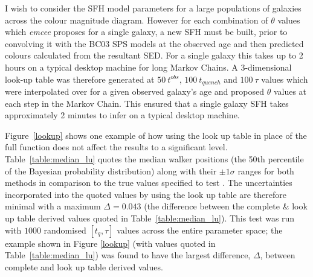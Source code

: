 \begin{table}
\end{table}

I wish to consider the SFH model parameters for a large populations of galaxies across the colour magnitude diagram. However for each combination of $\theta$ values which \emph{emcee} proposes for a single galaxy, a new SFH must be built, prior to convolving it with the BC03 SPS models at the observed age and then predicted colours calculated from the resultant SED. For a single galaxy this takes up to 2 hours on a typical desktop machine for long Markov Chains. A 3-dimensional look-up table was therefore generated at $50 ~t^{obs}$, $100 ~t_{quench}$ and $100 ~\tau$ values which were interpolated over for a given observed galaxy's age and proposed $\theta$ values at each step in the Markov Chain. This ensured that a single galaxy SFH takes approximately 2 minutes to infer on a typical desktop machine. 

Figure~\ref{lookup} shows one example of how using the look up table in place of the full function does not affect the results to a significant level. Table~\ref{table:median_lu} quotes the median walker positions (the 50th percentile of the Bayesian probability distribution) along with their $\pm 1\sigma$ ranges for both methods in comparison to the true values specified to test \starpy. The uncertainties incorporated into the quoted values by using the look up table are therefore minimal with a maximum $\Delta = 0.043$ (the difference between the complete \& look up table derived values quoted in Table~\ref{table:median_lu}). This test was run with $1000$ randomised $[t_q, \tau]$ values across the entire parameter space; the example shown in Figure \ref{lookup} (with values quoted in Table~\ref{table:median_lu}) was found to have the largest difference, $\Delta$, between complete and look up table derived values. 

